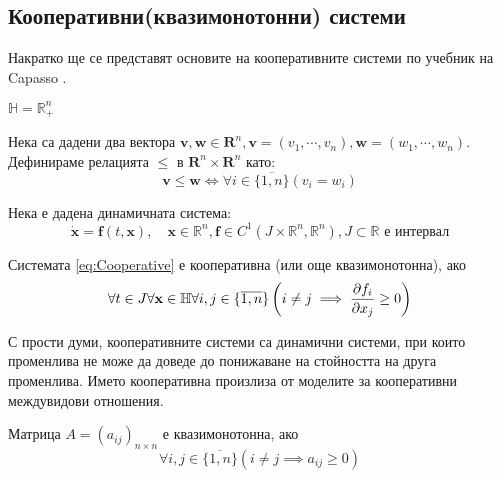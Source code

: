\subsection{Кооперативни(квазимонотонни) системи}
Накратко ще се представят основите на кооперативните системи по учебник на Capasso \cite{Capasso2008}.

\begin{definition}
  $\mathbb{H} = \mathbb{R}_{+}^n$
\end{definition}

\begin{definition}
  Нека са дадени два вектора $\mathbf{v}, \mathbf{w} \in \mathbf{R}^n, \mathbf{v}=(v_1, \cdots, v_n), \mathbf{w}=(w_1, \cdots, w_n)$. Дефинираме релацията $\leq$ в $\mathbf{R}^n \times \mathbf{R}^n$ като:
  \begin{equation*}
    \mathbf{v} \leq \mathbf{w} \iff \forall{i \in \{\overline{1,n}\}}(v_i = w_i)
  \end{equation*}
\end{definition}

Нека е дадена динамичната система:
\begin{equation}
  \label{eq:Cooperative}
  \dot{\mathbf{x}} = \mathbf{f}(t, \mathbf{x}),  \quad \mathbf{x} \in \mathbb{R}^n, \mathbf{f} \in C^1(J \times \mathbb{R}^n, \mathbb{R}^n), J \subset \mathbb{R} \text{ е интервал}
\end{equation}

\begin{definition}
  Системата \ref{eq:Cooperative} е кооперативна (или още квазимонотонна), ако
  \begin{equation}
    \forall{t \in J}\forall{\mathbf{x} \in \mathbb{H}}\forall{i,j \in \{\overline{1,n}\}}\left(i \neq j \implies \pdv{f_i}{x_j}(t, \mathbf{x}) \geq 0\right)
  \end{equation}
\end{definition}
С прости думи, кооперативните системи са динамични системи, при които променлива не може да доведе до понижаване на стойността на друга променлива. Името кооперативна произлиза от моделите за кооперативни междувидови отношения.

\begin{definition}
  Матрица $A=(a_{ij})_{n \times n}$ е квазимонотонна, ако
  \begin{equation*}
    \forall{i,j \in \{\overline{1,n}\}} \left(i \neq j \implies a_{ij} \geq 0\right)
  \end{equation*}
\end{definition}

